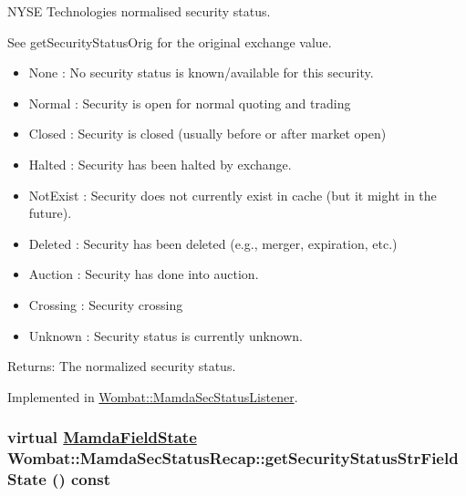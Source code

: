 NYSE Technologies normalised security status. 

See get\-Security\-Status\-Orig for the original exchange value.

\begin{itemize}
\item None : No security status is known/available for this security. \item Normal : Security is open for normal quoting and trading \item Closed : Security is closed (usually before or after market open) \item Halted : Security has been halted by exchange. \item Not\-Exist : Security does not currently exist in cache (but it might in the future). \item Deleted : Security has been deleted (e.g., merger, expiration, etc.)  \item Auction : Security has done into auction. \item Crossing : Security crossing \item Unknown : Security status is currently unknown. \end{itemize}


\begin{Desc}
\item[Returns:]The normalized security status. \end{Desc}


Implemented in \hyperlink{classWombat_1_1MamdaSecStatusListener_5d6a7b1c018030dbc0a3839bed5bbccb}{Wombat::Mamda\-Sec\-Status\-Listener}.\hypertarget{classWombat_1_1MamdaSecStatusRecap_f95c229e668def717ef05e1d8dc746ce}{
\subsubsection[getSecurityStatusStrFieldState]{\setlength{\rightskip}{0pt plus 5cm}virtual \hyperlink{namespaceWombat_93aac974f2ab713554fd12a1fa3b7d2a}{Mamda\-Field\-State} Wombat::Mamda\-Sec\-Status\-Recap::get\-Security\-Status\-Str\-Field\-State () const}}
\label{classWombat_1_1MamdaSecStatusRecap_f95c229e668def717ef05e1d8dc746ce}


